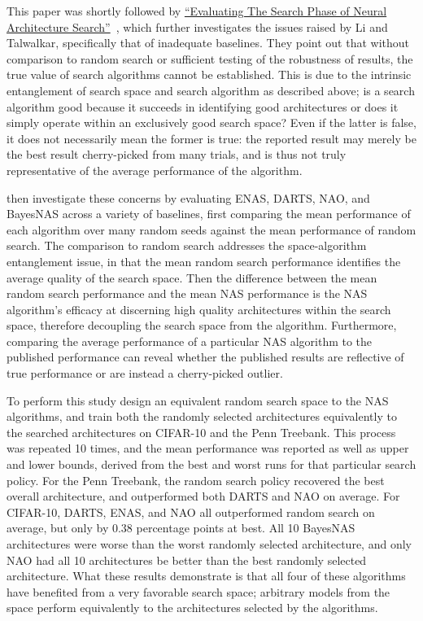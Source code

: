 This paper was shortly followed by \hyperlink{cite.yu2019}{``Evaluating The Search
Phase of Neural Architecture Search''}~\citep{yu2019}, which further investigates the issues raised by Li and Talwalkar,
specifically that of inadequate baselines. They point out that without comparison to random search or
sufficient testing of the robustness of results, the true value of search algorithms cannot be established. This is
due to the intrinsic entanglement of search space and search algorithm as described above; is a search algorithm good
because it succeeds in identifying good architectures or does it simply operate within an exclusively
good search space? Even if the latter is false, it does not necessarily mean the former is true: the reported result may
merely be the best result cherry-picked from many trials, and is thus not truly representative of the average performance of the algorithm.

\citeauthor{yu2019} then investigate these concerns by evaluating ENAS, DARTS, NAO, and BayesNAS across a variety of baselines,
first comparing the mean performance of each algorithm over many random seeds against the mean performance of random
search. The comparison to random search
addresses the space-algorithm entanglement issue, in that the mean random search performance identifies the
average quality of the search space. Then the difference between the mean random search performance and the mean NAS
performance is the NAS algorithm's efficacy at discerning high quality architectures within the search space,
therefore decoupling the search space from the algorithm. Furthermore, comparing the average performance of a
particular NAS algorithm to the published performance can reveal whether the published results are reflective of
true performance or are instead a cherry-picked outlier.

To perform this study \citeauthor{yu2019} design an equivalent random search space to the NAS algorithms, and train both the randomly selected
architectures equivalently to the searched architectures on CIFAR-10 and the Penn Treebank. This process was repeated 10 times,
and the mean performance was reported as well as upper and lower bounds, derived from the best and worst runs for that particular
search policy. For the Penn Treebank, the random search policy recovered the best overall architecture, and outperformed both DARTS and NAO on
average. For CIFAR-10, DARTS, ENAS, and NAO all outperformed random search on average, but only by $0.38$ percentage points at best.
All 10 BayesNAS architectures were worse than the worst randomly selected architecture, and only NAO had all 10 architectures
be better than the best randomly selected architecture. What these results demonstrate is that all four of these algorithms
have benefited from a very favorable search space; arbitrary models from the space perform equivalently to the architectures
selected by the algorithms.

